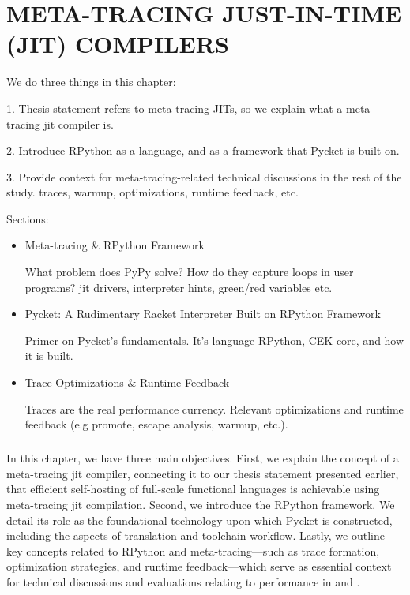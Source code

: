 \chapter[\texorpdfstring{META-TRACING JUST-IN-TIME (JIT) COMPILERS}
                          {2. RPython \& Meta-tracing}]{META-TRACING JUST-IN-TIME (JIT) COMPILERS}
    \label{chapter:rpython}

    \begin{chaptersynopsis}
        \footnotesize

        We do three things in this chapter:

        1. Thesis statement refers to meta-tracing JITs, so we explain what a meta-tracing \gls{jit} compiler is.

        2. Introduce RPython as a language, and as a framework that Pycket is built on.

        3. Provide context for meta-tracing-related technical discussions in the rest of the study. traces, warmup, optimizations, runtime feedback, etc.

        \vspace{2em}

        Sections:
		\begin{itemize}
			\item Meta-tracing \& RPython Framework

                What problem does PyPy solve? How do they capture loops in user programs? \gls{jit} drivers, interpreter hints, green/red variables etc.
			\item Pycket: A Rudimentary Racket Interpreter Built on RPython Framework

                Primer on Pycket's fundamentals. It's language RPython, CEK core, and how it is built.
			\item Trace Optimizations \& Runtime Feedback

                Traces are the real performance currency. Relevant optimizations and runtime feedback (e.g promote, escape analysis, warmup, etc.).
		\end{itemize}
    \end{chaptersynopsis}

    \paragraph{}%
        In this chapter, we have three main objectives. First, we explain the concept of a meta-tracing \gls{jit} compiler, connecting it to our thesis statement presented earlier, that efficient self-hosting of full-scale functional languages is achievable using meta-tracing \gls{jit} compilation. Second, we introduce the RPython framework. We detail its role as the foundational technology upon which Pycket is constructed, including the aspects of translation and toolchain workflow. Lastly, we outline key concepts related to RPython and meta-tracing—such as trace formation, optimization strategies, and runtime feedback—which serve as essential context for technical discussions and evaluations relating to performance in  and .

